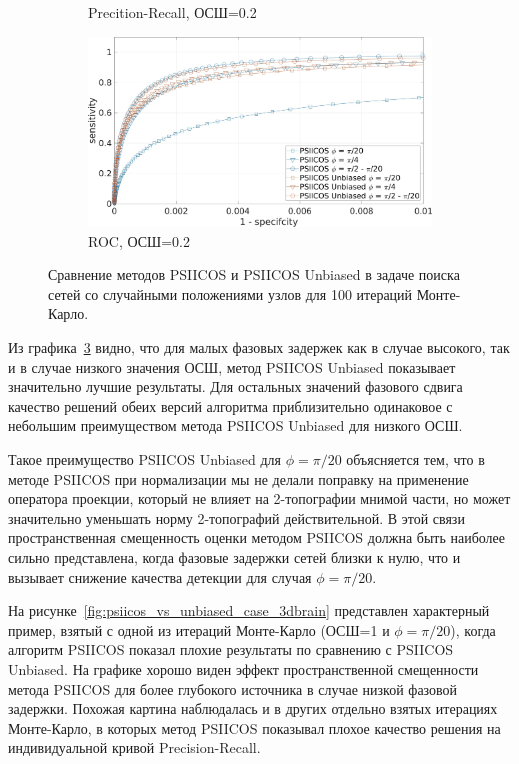 \begin{figure}[htbp]
\begin{subfigure}[t]{0.5\textwidth}
        \caption{Precition-Recall, ОСШ=0.2}\label{fig:psiicos_vs_unbiased_monte_c}
    \end{subfigure}
    \begin{subfigure}[t]{0.5\textwidth}
        \includegraphics[width=0.99\linewidth]{../images/roc_snr_02.jpg}
        \caption{ROC, ОСШ=0.2}\label{fig:psiicos_vs_unbiased_monte_d}
    \end{subfigure}
    \caption{Сравнение методов PSIICOS и PSIICOS Unbiased в задаче поиска сетей со случайными
    положениями узлов для 100 итераций Монте-Карло.}\label{fig:psiicos_vs_unbiased_monte}
\end{figure}

Из графика~\ref{fig:psiicos_vs_unbiased_monte} видно, что для малых фазовых задержек
как в случае высокого, так и в случае низкого значения ОСШ, метод PSIICOS Unbiased
показывает значительно лучшие результаты. Для остальных значений фазового сдвига
качество решений обеих версий алгоритма приблизительно одинаковое с небольшим
преимуществом метода PSIICOS Unbiased для низкого ОСШ.

Такое преимущество PSIICOS Unbiased для $\phi=\pi/20$ объясняется тем, что в методе
PSIICOS при нормализации мы не делали поправку на применение оператора проекции, который
не влияет на 2-топографии мнимой части, но может значительно уменьшать норму 2-топографий
действительной. В этой связи пространственная смещенность оценки методом PSIICOS должна
быть наиболее сильно представлена, когда фазовые задержки сетей близки к нулю, что и вызывает
снижение качества детекции для случая $\phi=\pi/20$.

На рисунке~\ref{fig:psiicos_vs_unbiased_case_3dbrain} представлен характерный пример, взятый с одной из итераций Монте-Карло (ОСШ=1 и $\phi=\pi/20$),
когда алгоритм PSIICOS показал плохие результаты
по сравнению с PSIICOS Unbiased. На графике хорошо виден эффект пространственной смещенности
метода PSIICOS для более глубокого источника в случае низкой фазовой задержки.
Похожая картина наблюдалась и в других отдельно взятых итерациях Монте-Карло, в которых
метод PSIICOS показывал плохое качество решения на индивидуальной кривой Precision-Recall.

